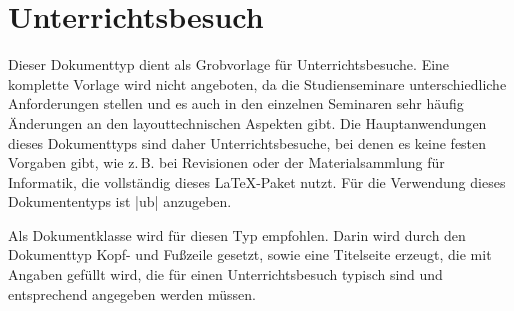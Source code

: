 \section{Unterrichtsbesuch}
\label{typ:ub}
Dieser Dokumenttyp dient als Grobvorlage für Unterrichtsbesuche. Eine komplette Vorlage wird nicht angeboten, da die Studienseminare unterschiedliche Anforderungen stellen und es auch in den einzelnen Seminaren sehr häufig Änderungen an den layouttechnischen Aspekten gibt. Die Hauptanwendungen dieses Dokumenttyps sind daher Unterrichtsbesuche, bei denen es keine festen Vorgaben gibt, wie z.\,B. bei Revisionen oder der Materialsammlung für Informatik, die vollständig dieses \LaTeX-Paket nutzt. Für die Verwendung dieses Dokumententyps ist \verbcode|ub| anzugeben.

Als Dokumentklasse wird für diesen Typ  empfohlen. Darin wird durch den Dokumenttyp Kopf- und Fußzeile gesetzt, sowie eine Titelseite erzeugt, die mit Angaben gefüllt wird, die für einen Unterrichtsbesuch typisch sind und entsprechend angegeben werden müssen.


